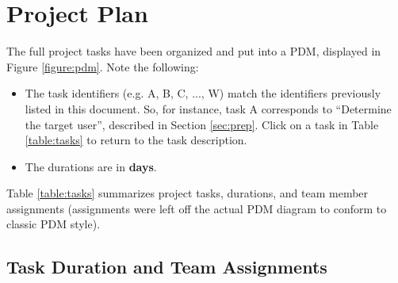 \chapter{Project Plan}

The full project tasks have been organized and put into a PDM, displayed in
Figure \ref{figure:pdm}. Note the following:

\begin{itemize}
    \item The task identifiers (e.g. A, B, C, ..., W) match the identifiers
          previously listed in this document. So, for instance, task A
          corresponds to ``Determine the target user'', described in
          Section \ref{sec:prep}. Click on a task in Table \ref{table:tasks}
          to return to the task description.
    \item The durations are in \textbf{days}.
\end{itemize}

Table \ref{table:tasks} summarizes project tasks, durations, and team member
assignments (assignments were left off the actual PDM diagram to conform to
classic PDM style).

\section{Task Duration and Team Assignments}

